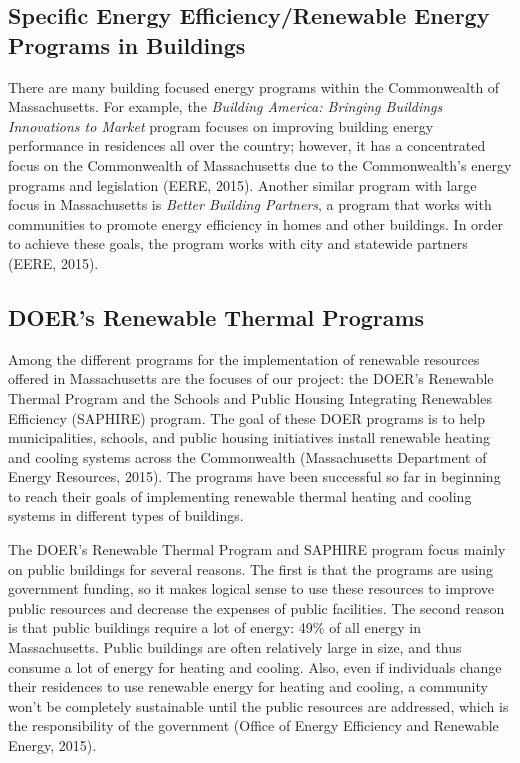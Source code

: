     \subsection{Specific Energy Efficiency/Renewable Energy Programs in Buildings}
    \par There are many building focused energy programs within the Commonwealth of Massachusetts. For example, the \emph{Building America: Bringing Buildings Innovations to Market}  program focuses on improving building energy performance in residences all over the country; however, it has a concentrated focus on the Commonwealth of Massachusetts due to the Commonwealth's energy programs and legislation (EERE, 2015). Another similar program with large focus in Massachusetts is \emph{Better Building Partners}, a program that works with communities to promote energy efficiency in homes and other buildings. In order to achieve these goals, the program works with city and statewide partners (EERE, 2015).

    \subsection{DOER's Renewable Thermal Programs}
    \par Among the different programs for the implementation of renewable resources offered in Massachusetts are the focuses of our project: the DOER's Renewable Thermal Program and the Schools and Public Housing Integrating Renewables Efficiency (SAPHIRE) program. The goal of these DOER programs is to help municipalities, schools, and public housing initiatives install renewable heating and cooling systems across the Commonwealth (Massachusetts Department of Energy Resources, 2015). The programs have been successful so far in beginning to reach their goals of implementing renewable thermal heating and cooling systems in different types of buildings. 
    \par The DOER's Renewable Thermal Program and SAPHIRE program focus mainly on public buildings for several reasons. The first is that the programs are using government funding, so it makes logical sense to use these resources to improve public resources and decrease the expenses of public facilities. The second reason is that public buildings require a lot of energy: 49\% of all energy in Massachusetts. Public buildings are often relatively large in size, and thus consume a lot of energy for heating and cooling. Also, even if individuals change their residences to use renewable energy for heating and cooling, a community won't be completely sustainable until the public resources are addressed, which is the responsibility of the government (Office of Energy Efficiency and Renewable Energy, 2015).

